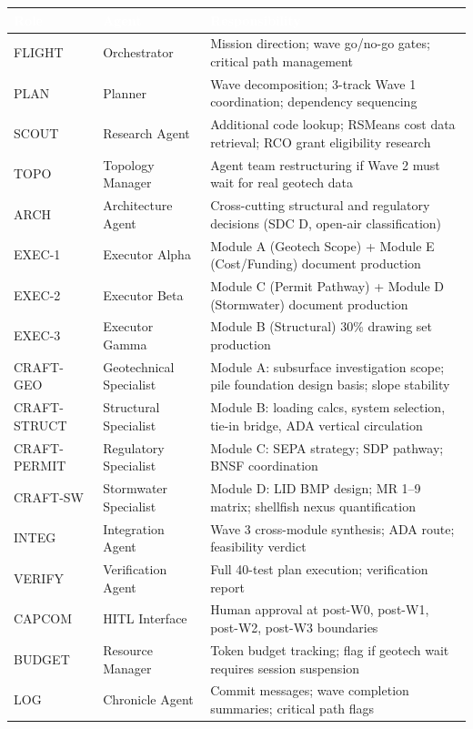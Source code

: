 \documentclass[11pt,letterpaper]{article}
\newcommand{\tableheader}[1]{\textbf{\sffamily\textcolor{white}{#1}}}
\begin{document}
\begin{center}
\begin{tabularx}{\textwidth}{L{2cm}L{2.5cm}X}
\toprule
{}
\tableheader{Role} & \tableheader{Agent} & \tableheader{Responsibility} \\
\midrule
FLIGHT & Orchestrator & Mission direction; wave go/no-go gates; critical path management \\
PLAN & Planner & Wave decomposition; 3-track Wave 1 coordination; dependency sequencing \\
SCOUT & Research Agent & Additional code lookup; RSMeans cost data retrieval; RCO grant eligibility research \\
TOPO & Topology Manager & Agent team restructuring if Wave 2 must wait for real geotech data \\
ARCH & Architecture Agent & Cross-cutting structural and regulatory decisions (SDC D, open-air classification) \\
EXEC-1 & Executor Alpha & Module A (Geotech Scope) + Module E (Cost/Funding) document production \\
EXEC-2 & Executor Beta & Module C (Permit Pathway) + Module D (Stormwater) document production \\
EXEC-3 & Executor Gamma & Module B (Structural) 30\% drawing set production \\
CRAFT-GEO & Geotechnical Specialist & Module A: subsurface investigation scope; pile foundation design basis; slope stability \\
CRAFT-STRUCT & Structural Specialist & Module B: loading calcs, system selection, tie-in bridge, ADA vertical circulation \\
CRAFT-PERMIT & Regulatory Specialist & Module C: SEPA strategy; SDP pathway; BNSF coordination \\
CRAFT-SW & Stormwater Specialist & Module D: LID BMP design; MR 1--9 matrix; shellfish nexus quantification \\
INTEG & Integration Agent & Wave 3 cross-module synthesis; ADA route; feasibility verdict \\
VERIFY & Verification Agent & Full 40-test plan execution; verification report \\
CAPCOM & HITL Interface & Human approval at post-W0, post-W1, post-W2, post-W3 boundaries \\
BUDGET & Resource Manager & Token budget tracking; flag if geotech wait requires session suspension \\
LOG & Chronicle Agent & Commit messages; wave completion summaries; critical path flags \\
\bottomrule
\end{tabularx}
\end{center}
\end{document}

